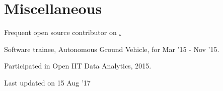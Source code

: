 \documentclass[a4paper]{deedy-resume} %
\newcommand{\newlink}[2]{
  \href{#1}{\color{black}#2}
}
\begin{document}
\begin{minipage}[t]{0.69\textwidth}
  \sectionspace
  \section{Miscellaneous}
  \vspace{\topsep}
  \begin{tightitemize}
  	\item Frequent open source contributor on \href{https://github.com/kaustubhhiware}{.}
  	\item Software trainee, Autonomous Ground Vehicle, for Mar '15 - Nov '15.
  	\item Participated in Open IIT Data Analytics, 2015.
  \end{tightitemize}

  \sectionspace

\end{minipage}

	\begin{flushright}
	\footnotesize Last updated on 15 Aug '17
	\end{flushright}
\end{document}
